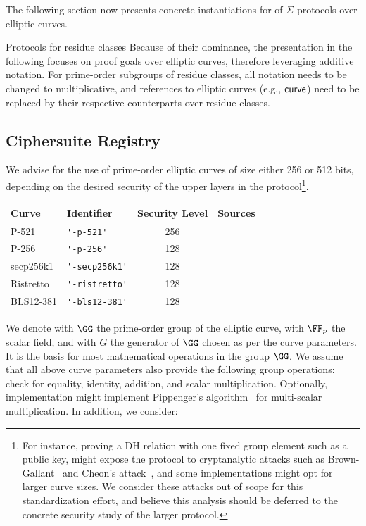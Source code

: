\documentclass[11pt]{article}
\begin{document}
The following section now presents concrete instantiations for of $\Sigma$-protocols over elliptic curves.

\begin{remark}{Protocols for residue classes}{}
  Because of their dominance, the presentation in the following focuses on proof goals over elliptic curves, therefore leveraging additive notation.
	For prime-order subgroups of residue classes, all notation needs to be changed to multiplicative, and references to elliptic curves (e.g., $\textsf{curve}$) need to be replaced by their respective counterparts over residue classes.
\end{remark}

\subsection{Ciphersuite Registry}
 We advise for the use of prime-order elliptic curves of size either 256 or 512 bits, depending on the desired security of the upper layers in the protocol\footnote{For instance, proving a DH relation with one fixed group element such as a public key, might expose the protocol to cryptanalytic attacks such as Brown-Gallant~\cite{EPRINT:BroGal04} and Cheon’s attack~\cite{EC:Cheon06}, and some implementations might opt for larger curve sizes. We consider these attacks out of scope for this standardization effort, and believe this analysis should be deferred to the concrete security study of the larger protocol.}.

 \vspace{1em}
 \begin{center}
 \begin{tabular}{llcc}
  \hline
  Curve  & Identifier &  Security Level & Sources \\
  \hline
 P-521 & \verb|'-p-521'|     & 256& \cite{fips2} \\
 P-256 & \verb|'-p-256'|     & 128 & \cite{fips2}  \\
 secp256k1 & \verb|'-secp256k1'| & 128 & \cite{SECG} \\
 Ristretto & \verb|'-ristretto'| & 128 & \cite{cfrg-ristretto-decaf} \\
 BLS12-381 & \verb|'-bls12-381'| & 128 & \cite{bls12} \\
 \end{tabular}
\end{center}
We denote with $\GG$ the prime-order group of the elliptic curve, with $\FF_p$ the scalar field, and with $G$ the generator of $\GG$ chosen as per the curve parameters. It is the basis for most mathematical operations in the group $\GG$.
We assume that all above curve parameters also provide the following group operations: check for equality, identity, addition, and scalar multiplication. Optionally, implementation might implement Pippenger's algorithm~\cite{pippenger} for multi-scalar multiplication. In addition, we consider:
\end{document}
